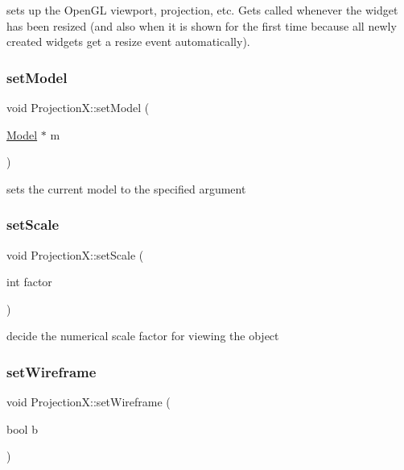 sets up the Open\+GL viewport, projection, etc. Gets called whenever the widget has been resized (and also when it is shown for the first time because all newly created widgets get a resize event automatically). 

\mbox{\label{class_projection_x_aab00d67a74912bdff9f963664b708c14}} 
\subsubsection{\texorpdfstring{set\+Model}{setModel}}
{\footnotesize\ttfamily void Projection\+X\+::set\+Model (\begin{DoxyParamCaption}\item[{\mbox{\hyperlink{class_model}{Model}} $\ast$}]{m }\end{DoxyParamCaption})\hspace{0.3cm}{\ttfamily [slot]}}



sets the current model to the specified argument 

\mbox{\label{class_projection_x_a863c01fcbb77cb13856feb3605fc6390}} 
\subsubsection{\texorpdfstring{set\+Scale}{setScale}}
{\footnotesize\ttfamily void Projection\+X\+::set\+Scale (\begin{DoxyParamCaption}\item[{int}]{factor }\end{DoxyParamCaption})\hspace{0.3cm}{\ttfamily [slot]}}



decide the numerical scale factor for viewing the object 

\mbox{\label{class_projection_x_a16849f2ef9fe0332c0ad9f833dc85651}} 
\subsubsection{\texorpdfstring{set\+Wireframe}{setWireframe}}
{\footnotesize\ttfamily void Projection\+X\+::set\+Wireframe (\begin{DoxyParamCaption}\item[{bool}]{b }\end{DoxyParamCaption})\hspace{0.3cm}{\ttfamily [slot]}}



